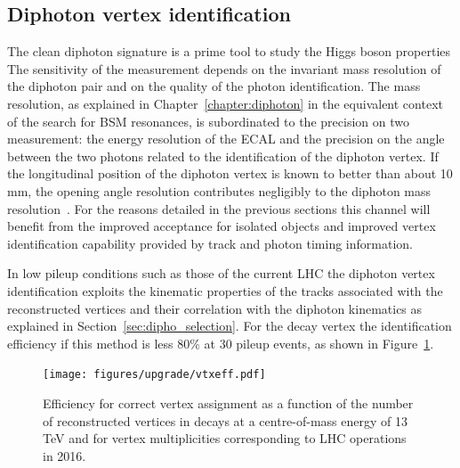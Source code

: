 \subsection{Diphoton vertex identification}
The clean diphoton signature is a prime tool to study the Higgs boson properties
The sensitivity of the measurement depends on the invariant mass resolution of the diphoton pair
and on the quality of the photon identification.
The mass resolution, as explained in Chapter~\ref{chapter:diphoton} in the equivalent context of the search for BSM resonances,
is subordinated to the precision on two measurement: the energy resolution of the ECAL and the precision on the
angle between the two photons related to the identification of the diphoton vertex.
If the longitudinal position of the diphoton vertex is known to better than about 10 mm, the opening angle
resolution contributes negligibly to the diphoton mass resolution~\cite{Khachatryan:2014ira}.
For the reasons detailed in the previous sections this channel will
benefit from the improved acceptance for isolated objects and improved vertex identification
capability provided by track and photon timing information.

In low pileup conditions such as those of the current LHC the diphoton vertex identification exploits
the kinematic properties of the tracks associated with the reconstructed vertices and their correlation with the diphoton
kinematics as explained in Section~\ref{sec:dipho_selection}.
For the \Hgg decay vertex the identification efficiency if this method is less $80\%$ at 30 pileup events,
as shown in Figure~\ref{fig:hgg_vtx_run2}.

\begin{figure}[h!]
  \centering
  \texttt{[image: figures/upgrade/vtxeff.pdf]}
  \caption{Efficiency for correct vertex assignment as a function of the number of reconstructed
    vertices in \Hgg decays at a centre-of-mass energy of 13 TeV and for vertex multiplicities
    corresponding to LHC operations in 2016.}
  \label{fig:hgg_vtx_run2}
\end{figure}

